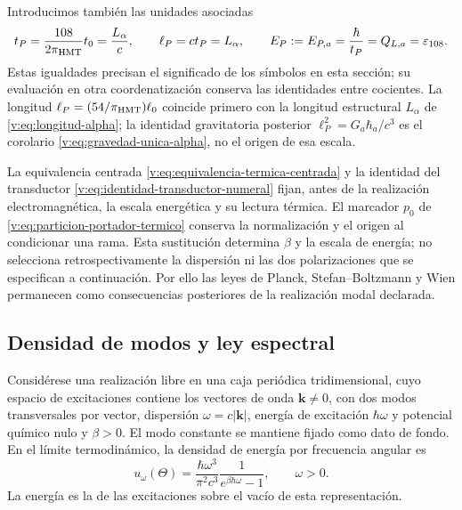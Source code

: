 Introducimos también las unidades asociadas
\begin{equation}
 t_P=\frac{108}{2\pi_{\mathrm{HMT}}}t_0=\frac{L_\alpha}{c},\qquad
 \ell_P=ct_P=L_\alpha,\qquad
 E_P:=E_{P,a}=\frac{\hbar}{t_P}=Q_{L,a}=\varepsilon_{108}.
 \label{v:eq:unidades-termicas-calendario}
\end{equation}
Estas igualdades precisan el significado de los símbolos en esta sección;
su evaluación en otra coordenatización conserva las identidades entre cocientes.
La longitud \(\ell_P=(54/\pi_{\mathrm{HMT}})\ell_0\) coincide primero con
la longitud estructural \(L_\alpha\) de
\eqref{v:eq:longitud-alpha}; la identidad gravitatoria posterior
\(\ell_P^2=G_a\hbar_a/c^3\) es el corolario
\eqref{v:eq:gravedad-unica-alpha}, no el origen de esa escala.

La equivalencia centrada
\eqref{v:eq:equivalencia-termica-centrada} y la identidad del transductor
\eqref{v:eq:identidad-transductor-numeral} fijan, antes de la realización
electromagnética, la escala energética y su lectura térmica. El marcador
$p_0$ de \eqref{v:eq:particion-portador-termico} conserva la normalización
y el origen al condicionar una rama. Esta sustitución determina $\beta$ y
la escala de energía; no selecciona retrospectivamente la dispersión ni
las dos polarizaciones que se especifican a continuación. Por ello las
leyes de Planck, Stefan--Boltzmann y Wien permanecen como consecuencias
posteriores de la realización modal declarada.

\subsection{Densidad de modos y ley espectral}

\begin{proposition}
\label{v:prop:ley-espectral}
Considérese una realización libre en una caja periódica tridimensional,
cuyo espacio de excitaciones contiene los vectores de onda
\(\mathbf k\ne0\), con dos modos transversales por vector, dispersión
\(\omega=c|\mathbf k|\), energía de excitación \(\hbar\omega\) y
potencial químico nulo y \(\beta>0\). El modo constante se mantiene
fijado como dato de fondo. En el límite termodinámico, la densidad de energía
por frecuencia angular es
\begin{equation}
 u_\omega(\Theta)=\frac{\hbar\omega^3}{\pi^2c^3}
 \frac{1}{e^{\beta\hbar\omega}-1},\qquad \omega>0.
 \label{v:eq:planck-angular}
\end{equation}
La energía es la de las excitaciones sobre el vacío de esta
representación.
\end{proposition}

